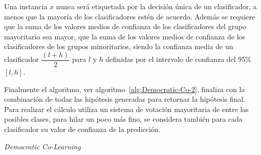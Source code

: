 Una instancia $x$ nunca será etiquetada por la decisión única de un clasificador, a menos que la mayoría de los clasificadores estén de acuerdo. Además se requiere que la suma de los valores medios de confianza de los clasificadores del grupo mayoritario sea mayor, que la suma de los valores medios de confianza de los clasificadores de los grupos minoritarios, siendo la confianza media de un clasificador $ \dfrac{(l + h)}{2}
$ para $l$ y $h$ definidas por el intervalo de confianza del 95\% $\left[l,h\right]$.

Finalmente el algoritmo, ver algoritmo~\ref{alg:Democratic-Co-2}, finaliza con la combinación de todas las hipótesis generadas para retornar la hipótesis final. Para realizar el cálculo utiliza un sistema de votación mayoritaria de entre las posibles clases, para hilar un poco más fino, se considera también para cada clasificador su valor de confianza de la predicción. 

\begin{algorithm}[H]
  	\BlankLine
	\AlgoSaveLineCount
	\caption{\textit{Democratic Co-Learning}}\label{alg:Democratic-Co}
\end{algorithm}

